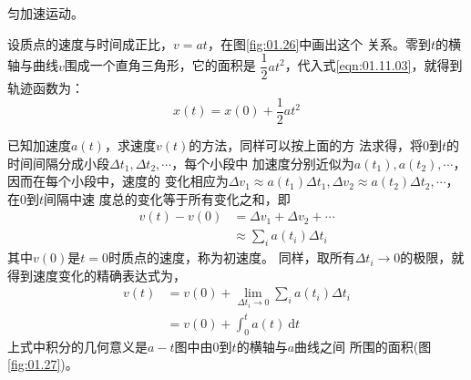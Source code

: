 \example 匀加速运动。

设质点的速度与时间成正比，$v=at$，在图\ref{fig:01.26}中画出这个
关系。零到$t$的横轴与曲线$v$围成一个直角三角形，它的面积是
$\dfrac{1}{2} a t^2$，代入式\eqref{eqn:01.11.03}，就得到轨迹函数为：
\begin{equation*}\label{eqn:01.11.04i}
  x\left(t\right)=x\left(0\right)+\frac{1}{2}at^2 \tag{1.11.4$'$}
\end{equation*}

已知加速度$a\left(t\right)$，求速度$v\left(t\right)$的方法，同样可以按上面的方
法求得，将0到$t$的时间间隔分成小段$\Delta t_1 , \Delta t_2 , \cdots$，每个小段中
加速度分别近似为$a\left(t_1\right) , a\left(t_2\right) , \cdots$，因而在每个小段中，速度的
变化相应为$\Delta v_1\approx a\left(t_1\right)\Delta t_1 , \Delta v_2\approx a\left(t_2\right)\Delta t_2 , \cdots$，在0到$t$间隔中速
度总的变化等于所有变化之和，即
\begin{equation}\label{eqn:01.11.05}
  \begin{aligned}
    v\left(t\right)-v\left(0\right) & =\Delta v_{1}+\Delta v_{2}+\cdots                 \\
                                    & \approx \sum_{i} a\left(t_{i}\right) \Delta t_{i}
  \end{aligned}
\end{equation}
其中$v\left(0\right)$是$t=0$时质点的速度，称为初速度。
同样，取所有$\Delta t _ i \to 0$的极限，就得到速度变化的精确表达式为，
\begin{equation}\label{eqn:01.11.06}
  \begin{aligned}
    v\left(t\right) & =v\left(0\right)+\lim _{\Delta t_{i} \rightarrow 0} \sum_ i a\left(t_{i}\right) \Delta t_{i} \\
                    & =v\left(0\right)+\int_{0}^{t} a\left(t\right) {~\mathrm d} t
  \end{aligned}
\end{equation}
上式中积分的几何意义是$a-t$图中由0到$t$的横轴与$a$曲线之间
所围的面积(图\ref{fig:01.27})。


